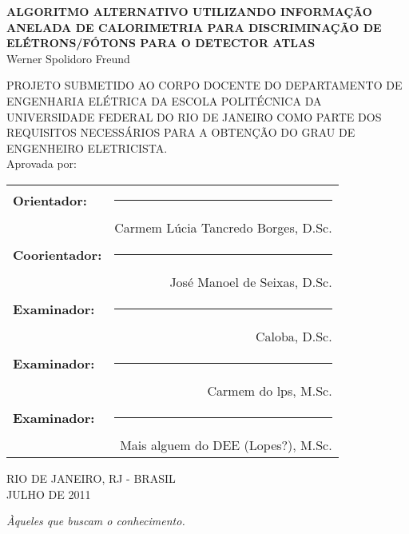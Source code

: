 \begin{titlepage}
	\vfill
	\begin{center}
		{\large \uppercase{\bf{Algoritmo Alternativo utilizando informação anelada de calorimetria para discriminação de elétrons/fótons para o detector ATLAS}}}\\[0.9cm]
    {Werner Spolidoro Freund}\\[0.9cm]
  \end{center}

		{\uppercase{PROJETO SUBMETIDO AO CORPO DOCENTE DO DEPARTAMENTO DE ENGENHARIA ELÉTRICA DA ESCOLA POLITÉCNICA DA UNIVERSIDADE FEDERAL DO RIO DE JANEIRO COMO PARTE DOS REQUISITOS NECESSÁRIOS PARA A OBTENÇÃO DO GRAU DE ENGENHEIRO ELETRICISTA.}}\\[0.3cm]

    {Aprovada por:}\\[0.5cm]

  \begin{flushright}
		\begin{tabular}{lr}
			{\bf Orientador:} & \rule{8cm}{0.4pt} \\
					 & Carmem Lúcia Tancredo Borges, D.Sc. \\[0.5cm]
			{\bf Coorientador:}& \rule{8cm}{0.4pt} \\ 
					 & José Manoel de Seixas, D.Sc. \\[0.5cm]
			{\bf Examinador:}& \rule{8cm}{0.4pt} \\
					 & Caloba, D.Sc. \\[0.5cm]
			{\bf Examinador:}& \rule{8cm}{0.4pt} \\
					 & Carmem do lps, M.Sc. \\[0.5cm]
			{\bf Examinador:}& \rule{8cm}{0.4pt} \\
					 & Mais alguem do DEE (Lopes?), M.Sc. \\
		\end{tabular}
	\end{flushright}
    \vskip1.0cm
  \begin{center}
		\begin{large}
			RIO DE JANEIRO, RJ - BRASIL \\
      JULHO DE 2011
		\end{large}
  \end{center}
\end{titlepage}

\cleardoublepage

\null
\vfill
\begin{flushright}
  \em{Àqueles que buscam o conhecimento.}\\
\end{flushright}
